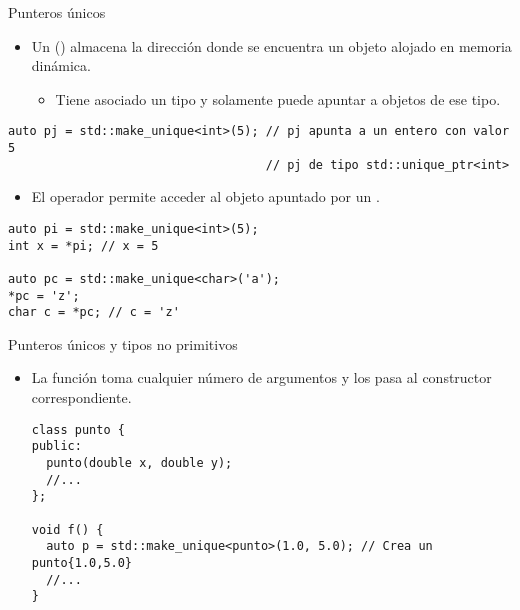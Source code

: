 \begin{frame}[t,fragile]{Punteros únicos}
\begin{itemize}
  \item Un  () almacena la dirección
        donde se encuentra un objeto alojado en memoria dinámica.
    \begin{itemize}
      \item Tiene asociado un tipo y solamente puede apuntar a objetos de ese tipo.
    \end{itemize}
\end{itemize}
\begin{lstlisting}
auto pj = std::make_unique<int>(5); // pj apunta a un entero con valor 5
                                    // pj de tipo std::unique_ptr<int>
\end{lstlisting}

\begin{itemize}
  \item El operador \cppkey{*} permite acceder al objeto apuntado por un 
        .
\end{itemize}
\begin{lstlisting}
auto pi = std::make_unique<int>(5);
int x = *pi; // x = 5

auto pc = std::make_unique<char>('a');
*pc = 'z'; 
char c = *pc; // c = 'z'
\end{lstlisting}
\end{frame}

\begin{frame}[t,fragile]{Punteros únicos y tipos no primitivos}
\begin{itemize}
  \item La función  toma cualquier número de argumentos
        y los pasa al constructor correspondiente.
\begin{lstlisting}
class punto {
public:
  punto(double x, double y);
  //...
};

void f() {
  auto p = std::make_unique<punto>(1.0, 5.0); // Crea un punto{1.0,5.0}
  //...
}
\end{lstlisting}
\end{itemize}
\end{frame}
